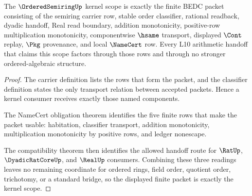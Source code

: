\begin{theorem}
\label{thm:ordered-semiring-kernel-scope}
The $\OrderedSemiringUp$ kernel scope is exactly the finite BEDC packet consisting of the semiring carrier row, stable order classifier, rational readback, dyadic handoff, Real read boundary, addition monotonicity, positive-row multiplication monotonicity, componentwise $\hsame$ transport, displayed $\Cont$ replay, $\Pkg$ provenance, and local $\NameCert$ row. Every L10 arithmetic handoff that claims this scope factors through those rows and through no stronger ordered-algebraic structure.
\end{theorem}
\begin{proof}
The carrier definition lists the rows that form the packet, and the classifier definition states the only transport relation between accepted packets. Hence a kernel consumer receives exactly those named components.

The NameCert obligation theorem identifies the five finite rows that make the packet usable: habitation, classifier transport, addition monotonicity, multiplication monotonicity by positive rows, and ledger nonescape.

The compatibility theorem then identifies the allowed handoff route for $\RatUp$, $\DyadicRatCoreUp$, and $\RealUp$ consumers. Combining these three readings leaves no remaining coordinate for ordered rings, field order, quotient order, trichotomy, or a standard bridge, so the displayed finite packet is exactly the kernel scope.
\end{proof}




